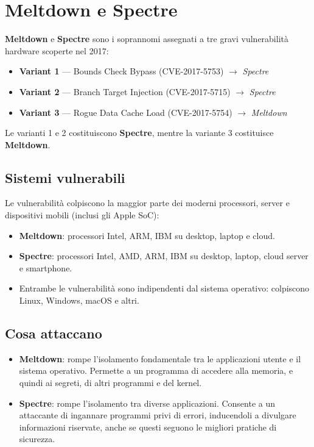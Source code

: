 \documentclass{article}
\begin{document}
\section{Meltdown e Spectre}


\textbf{Meltdown} e \textbf{Spectre} sono i soprannomi assegnati a tre gravi vulnerabilità hardware scoperte nel 2017:

\begin{itemize}
    \item \textbf{Variant 1} --- Bounds Check Bypass (CVE-2017-5753) $\rightarrow$ \textit{Spectre}
    \item \textbf{Variant 2} --- Branch Target Injection (CVE-2017-5715) $\rightarrow$ \textit{Spectre}
    \item \textbf{Variant 3} --- Rogue Data Cache Load (CVE-2017-5754) $\rightarrow$ \textit{Meltdown}
\end{itemize}

Le varianti 1 e 2 costituiscono \textbf{Spectre}, mentre la variante 3 costituisce \textbf{Meltdown}.

\subsection*{Sistemi vulnerabili}

Le vulnerabilità colpiscono la maggior parte dei moderni processori, server e dispositivi mobili (inclusi gli Apple SoC):

\begin{itemize}
    \item \textbf{Meltdown}: processori Intel, ARM, IBM su desktop, laptop e cloud.
    \item \textbf{Spectre}: processori Intel, AMD, ARM, IBM su desktop, laptop, cloud server e smartphone.
    \item Entrambe le vulnerabilità sono indipendenti dal sistema operativo: colpiscono Linux, Windows, macOS e altri.
\end{itemize}

\subsection*{Cosa attaccano}

\begin{itemize}
    \item \textbf{Meltdown}: rompe l'isolamento fondamentale tra le applicazioni utente e il sistema operativo. Permette a un programma di accedere alla memoria, e quindi ai segreti, di altri programmi e del kernel.
    
    \item \textbf{Spectre}: rompe l'isolamento tra diverse applicazioni. Consente a un attaccante di ingannare programmi privi di errori, inducendoli a divulgare informazioni riservate, anche se questi seguono le migliori pratiche di sicurezza.
\end{itemize}
\end{document}
